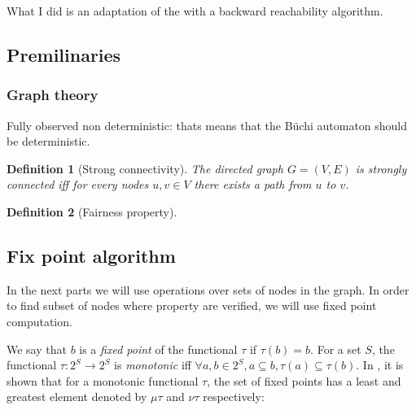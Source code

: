 \documentclass{article}
\theoremstyle{named}
\newtheorem*{nameddefinition}{Definition}
\newcommand{\thmsymbol}{\( \blacktriangle \)}
\newenvironment{nameddef}[1]
    {\begin{samepage}
    \begin{nameddefinition}[#1]
    \renewcommand{\qedsymbol}{\thmsymbol}\pushQED{\qed}
    }
    {
    \popQED %
    \end{nameddefinition} 
    \end{samepage}
    }
\newcommand{\inlinedef}[1]{\textit{#1}}
\begin{document}
What I did is an adaptation of the \cite{fu2011simple} with a backward reachability algorithm.

\subsection{Premilinaries}

\subsubsection{Graph theory}
Fully observed non deterministic: thats means that the B\"uchi automaton should be deterministic.

\begin{nameddef}{Strong connectivity}
The directed graph $G = (V,E)$ is strongly connected iff for every nodes $u,v \in V$ there exists a path from $u$ to $v$.
\end{nameddef}


\begin{nameddef}{Fairness property}

\end{nameddef}

\subsection{Fix point algorithm}

In the next parts we will use operations over sets of nodes in the graph. In order to find subset of nodes where property are verified, we will use fixed point computation.

We say that $b$ is a \inlinedef{fixed point} of the functional $\tau$ if $\tau(b) = b$.
For a set $S$, the functional $\tau: 2^S \rightarrow 2^S$ is  \inlinedef{monotonic} iff $\forall a,b \in 2^S, a \subseteq b, \tau(a) \subseteq \tau(b)$.
In \cite{tarski}, it is shown that for a monotonic functional $\tau$,
the set of fixed points has a least and greatest element denoted by $\mu \tau$ and $\nu \tau$ respectively:
\end{document}
